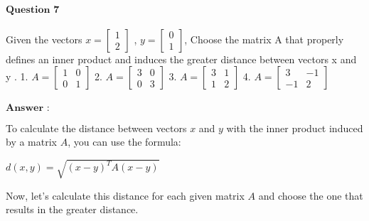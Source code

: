 \documentclass[11pt]{article}
\begin{document}
    $\textbf{Question 7}$\\
~\\
Given the vectors $x=\begin{bmatrix} 1 \\ 2 \end{bmatrix}$ ,
$y=\begin{bmatrix} 0 \\ 1 \end{bmatrix}$, Choose the matrix A that
properly defines an inner product and induces the greater distance
between vectors x and y . 1.
$A=\begin{bmatrix} 1 & 0 \\ 0 & 1 \end{bmatrix}$ 2.
$A=\begin{bmatrix} 3 & 0 \\ 0 & 3 \end{bmatrix}$ 3.
$A=\begin{bmatrix} 3 & 1 \\ 1 & 2 \end{bmatrix}$ 4.
$A=\begin{bmatrix} 3 & -1 \\ -1 & 2 \end{bmatrix}$\\
~\\
$\textbf{Answer :}$

    To calculate the distance between vectors $x$ and $y$ with the inner
product induced by a matrix $A$, you can use the formula:

$ d(x, y) = \sqrt{(x - y)^T A (x - y)} $

Now, let's calculate this distance for each given matrix $A$ and
choose the one that results in the greater distance.
\end{document}
